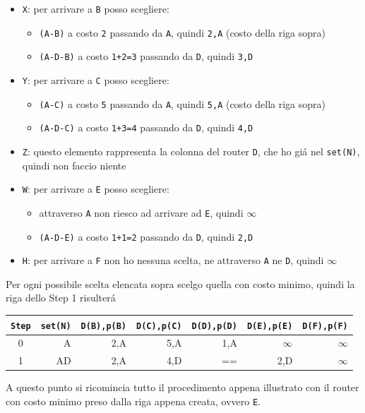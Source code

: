 \documentclass[12pt]{article}
\def\code#1{\texttt{#1}}
\begin{document}
\begin{itemize}[noitemsep]
	\item \code{X}: per arrivare a \code{B} posso scegliere:
	\begin{itemize}[noitemsep]
		\item \code{(A-B)} a costo \code{2} passando da \code{A}, quindi \code{2,A} (costo della riga sopra)
		\item \code{(A-D-B)} a costo \code{1+2=3} passando da \code{D}, quindi \code{3,D}	
	\end{itemize}
	\item \code{Y}: per arrivare a \code{C} posso scegliere:
	\begin{itemize}[noitemsep]
		\item \code{(A-C)} a costo \code{5} passando da \code{A}, quindi \code{5,A} (costo della riga sopra)
		\item \code{(A-D-C)} a costo \code{1+3=4} passando da \code{D}, quindi \code{4,D}	
	\end{itemize}
	\item \code{Z}: questo elemento rappresenta la colonna del router \code{D}, che ho gi\'a nel \code{set(N)}, quindi non 
	      faccio niente
	\item \code{W}: per arrivare a \code{E} posso scegliere:
	\begin{itemize}[noitemsep]
		\item attraverso \code{A} non riesco ad arrivare ad \code{E}, quindi $\infty$
		\item \code{(A-D-E)} a costo \code{1+1=2} passando da \code{D}, quindi \code{2,D}	
	\end{itemize}
	\item \code{H}: per arrivare a \code{F} non ho nessuna scelta, ne attraverso \code{A} ne \code{D}, quindi $\infty$
\end{itemize}
Per ogni possibile scelta elencata sopra scelgo quella con costo minimo\footnotemark[\ref{note1}], quindi la riga dello Step 
1 risulter\'a

\begin{center}
\renewcommand{\arraystretch}{1.2}%
\begin{tabular}{ c r r r r r r }
	\code{Step} & \code{set(N)} & \code{D(B),p(B)} & \code{D(C),p(C)} & \code{D(D),p(D)} & \code{D(E),p(E)} & 
	\code{D(F),p(F)}\\ \hline
	0 &      A & 2,A              & 5,A              & {\color{red}1,A} & $\infty$         & $\infty$         \\ \hline
	1 &     AD & 2,A              & 4,D              & ==               & {\color{red}2,D} & $\infty$         \\ \hline
\end{tabular}
\end{center}
A questo punto si ricomincia tutto il procedimento appena illustrato con il router con costo minimo preso dalla riga appena 
creata, ovvero \code{E}. 
\end{document}
